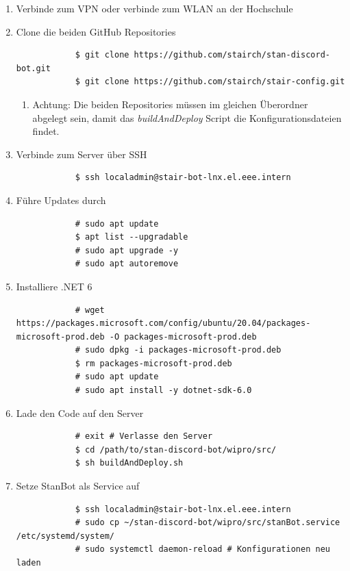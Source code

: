 \documentclass[a4paper, table]{article}
\begin{document}
\begin{enumerate}
    \item Verbinde zum VPN oder verbinde zum WLAN an der Hochschule
    \item Clone die beiden GitHub Repositories
        \begin{verbatim}
            $ git clone https://github.com/stairch/stan-discord-bot.git
            $ git clone https://github.com/stairch/stair-config.git
        \end{verbatim}
        \begin{enumerate}
            \item Achtung: Die beiden Repositories müssen im gleichen Überordner abgelegt sein, damit das \textit{buildAndDeploy} Script die Konfigurationsdateien findet.
        \end{enumerate}
    \item Verbinde zum Server über SSH
        \begin{verbatim}
            $ ssh localadmin@stair-bot-lnx.el.eee.intern
        \end{verbatim}
    \item Führe Updates durch
        \begin{verbatim}
            # sudo apt update
            $ apt list --upgradable
            # sudo apt upgrade -y
            # sudo apt autoremove
        \end{verbatim}
    \item Installiere .NET 6
        \begin{verbatim}
            # wget https://packages.microsoft.com/config/ubuntu/20.04/packages-microsoft-prod.deb -O packages-microsoft-prod.deb
            # sudo dpkg -i packages-microsoft-prod.deb
            $ rm packages-microsoft-prod.deb
            # sudo apt update
            # sudo apt install -y dotnet-sdk-6.0
        \end{verbatim}
    \item Lade den Code auf den Server
        \begin{verbatim}
            # exit # Verlasse den Server
            $ cd /path/to/stan-discord-bot/wipro/src/
            $ sh buildAndDeploy.sh
        \end{verbatim}
    \item Setze StanBot als Service auf
        \begin{verbatim}
            $ ssh localadmin@stair-bot-lnx.el.eee.intern
            # sudo cp ~/stan-discord-bot/wipro/src/stanBot.service /etc/systemd/system/
            # sudo systemctl daemon-reload # Konfigurationen neu laden

\end{verbatim}
\end{enumerate}
\end{document}
